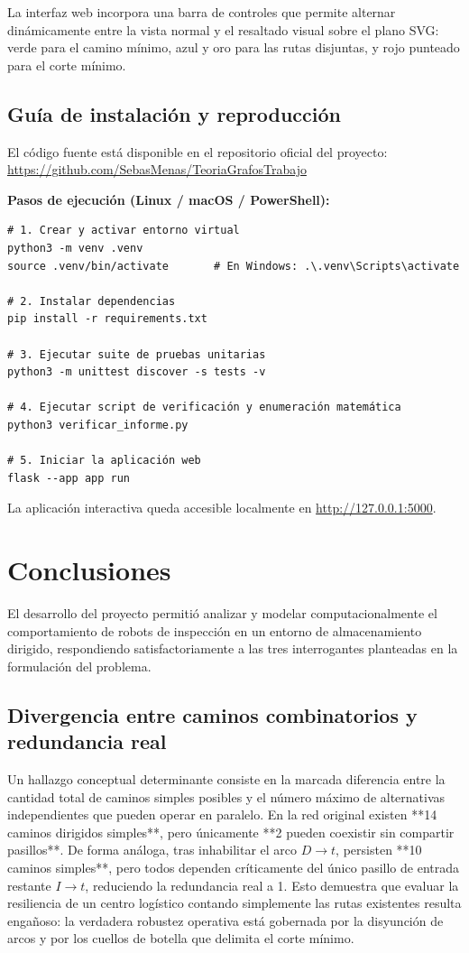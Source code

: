 \documentclass[11pt,a4paper]{article}
\newcommand{\tema}[1]{\subsection*{\color{verde}#1}}
\begin{document}
La interfaz web incorpora una barra de controles que permite alternar dinámicamente entre la vista normal y el resaltado visual sobre el plano SVG: verde para el camino mínimo, azul y oro para las rutas disjuntas, y rojo punteado para el corte mínimo.

\subsection{Guía de instalación y reproducción}
El código fuente está disponible en el repositorio oficial del proyecto:\\
\url{https://github.com/SebasMenas/TeoriaGrafosTrabajo}

\textbf{Pasos de ejecución (Linux / macOS / PowerShell):}
\begin{verbatim}
# 1. Crear y activar entorno virtual
python3 -m venv .venv
source .venv/bin/activate       # En Windows: .\.venv\Scripts\activate

# 2. Instalar dependencias
pip install -r requirements.txt

# 3. Ejecutar suite de pruebas unitarias
python3 -m unittest discover -s tests -v

# 4. Ejecutar script de verificación y enumeración matemática
python3 verificar_informe.py

# 5. Iniciar la aplicación web
flask --app app run
\end{verbatim}
La aplicación interactiva queda accesible localmente en \url{http://127.0.0.1:5000}.

\clearpage
\section{Conclusiones}

El desarrollo del proyecto permitió analizar y modelar computacionalmente el comportamiento de robots de inspección en un entorno de almacenamiento dirigido, respondiendo satisfactoriamente a las tres interrogantes planteadas en la formulación del problema.

\tema{Divergencia entre caminos combinatorios y redundancia real}
Un hallazgo conceptual determinante consiste en la marcada diferencia entre la cantidad total de caminos simples posibles y el número máximo de alternativas independientes que pueden operar en paralelo. En la red original existen **14 caminos dirigidos simples**, pero únicamente **2 pueden coexistir sin compartir pasillos**. De forma análoga, tras inhabilitar el arco $D \to t$, persisten **10 caminos simples**, pero todos dependen críticamente del único pasillo de entrada restante $I \to t$, reduciendo la redundancia real a 1. Esto demuestra que evaluar la resiliencia de un centro logístico contando simplemente las rutas existentes resulta engañoso: la verdadera robustez operativa está gobernada por la disyunción de arcos y por los cuellos de botella que delimita el corte mínimo.
\end{document}
